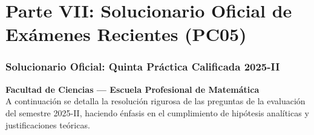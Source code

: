 \documentclass[11pt,a4paper]{article}
\begin{document}
\newpage
\part*{Parte VII: Solucionario Oficial de Exámenes Recientes (PC05)}

\section{Solucionario Oficial: Quinta Práctica Calificada 2025-II}
\textbf{Facultad de Ciencias --- Escuela Profesional de Matemática}\\[0.2cm]
A continuación se detalla la resolución rigurosa de las preguntas de la evaluación del semestre 2025-II, haciendo énfasis en el cumplimiento de hipótesis analíticas y justificaciones teóricas.
\end{document}
